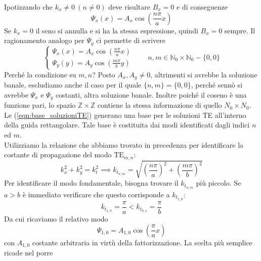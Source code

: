 \documentclass{book}
\begin{document}
    Ipotizzando che $k_{x} \neq 0  \ (n \neq 0)$ deve risultare $B_{x}=0$ e di conseguenze
    \begin{equation}
        \Psi_{x}(x)=A_{x}\cos(\frac{n\pi}{a}x)
    \end{equation}
    Se $k_{x}=0$ il seno si annulla e si ha la stessa espressione, quindi $B_{x}=0$ sempre. Il ragionamento analogo 
    per $\Psi_{y}$ ci permette di scrivere 
    \begin{equation}
        \label{eqn:base_soluzioniTE}
        \begin{cases}
            \Psi_{x}(x) = A_{x}\cos(\frac{n \pi}{a}x)  \\
            \Psi_{y}(y) = A_{y}\cos(\frac{m \pi}{b}y) 
        \end{cases}
        \qquad n, m \in \mathbb{N}_{0} \times \mathbb{N}_{0} - \{0, 0\}
    \end{equation}
    Perché la condizione su $m,n $? Posto $A_{x}, A_{y} \neq 0$, altrimenti si avrebbe la soluzione banale, escludiamo anche il caso per il quale $\{n,m\} = \{0,0\}$,
    perché sennò si avrebbe $\Psi_{x}$ e $\Psi_{y}$ costanti, altra soluzione banale. Inoltre poiché il coseno è una funzione pari, lo spazio $\mathbb{Z} \times \mathbb{Z}$
    contiene la stessa informazione di quello $N_{0} \times N_{0}$. 
    \\ Le (\ref{eqn:base_soluzioniTE}) generano una base per le soluzioni TE all'interno della guida rettangolare. Tale base è costituita dai modi 
    identificati dagli indici $n$ ed $m$. \\
    Utilizziamo la relazione che abbiamo trovato in precedenza per identificare la costante di propagazione del modo $\textrm{TE}_{m,n}$:
    \begin{equation}
        k_{x} ^{2} +k_{y} ^{2}= k_{t} ^{2} \implies k_{t_{n,m}} = \sqrt{(\frac{n \pi}{a})^{2}+(\frac{m \pi}{b})^{2}}
    \end{equation}
    Per identificare il modo fondamentale, bisogna trovare il $k_{t_{n,m}}$ più piccolo. Se $a>b$ è immediato verificare che questo corrisponde 
    a $k_{t_{1,0}}$:
    \begin{equation}
        k_{t_{1,0}} = \frac{\pi}{a} < k_{t_{0,1}} = \frac{\pi}{b}
    \end{equation}
    Da cui ricaviamo il relativo modo
    \begin{equation}
        \Psi_{1,0} = A_{1,0}\cos(\frac{\pi}{a}x)
    \end{equation}
    con $A_{1,0}$ costante arbitraria in virtù della fattorizzazione. La scelta più semplice ricade nel porre 
\end{document}
